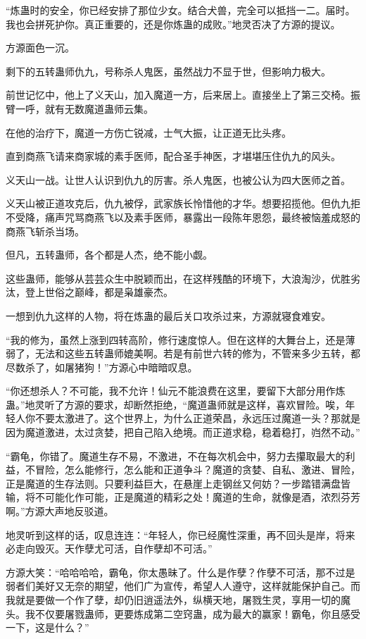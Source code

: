 \begin{this_body}
“炼蛊时的安全，你已经安排了那位少女。结合犬兽，完全可以抵挡一二。届时。我也会拼死护你。真正重要的，还是你炼蛊的成败。”地灵否决了方源的提议。

方源面色一沉。

剩下的五转蛊师仇九，号称杀人鬼医，虽然战力不显于世，但影响力极大。

前世记忆中，他上了义天山，加入魔道一方，后来居上。直接坐上了第三交椅。振臂一呼，就有无数魔道蛊师云集。

在他的治疗下，魔道一方伤亡锐减，士气大振，让正道无比头疼。

直到商燕飞请来商家城的素手医师，配合圣手神医，才堪堪压住仇九的风头。

义天山一战。让世人认识到仇九的厉害。杀人鬼医，也被公认为四大医师之首。

义天山被正道攻克后，仇九被俘，武家族长怜惜他的才华。想要招揽他。但仇九拒不受降，痛声咒骂商燕飞以及素手医师，暴露出一段陈年恩怨，最终被恼羞成怒的商燕飞斩杀当场。

但凡，五转蛊师，各个都是人杰，绝不能小觑。

这些蛊师，能够从芸芸众生中脱颖而出，在这样残酷的环境下，大浪淘沙，优胜劣汰，登上世俗之巅峰，都是枭雄豪杰。

一想到仇九这样的人物，将在炼蛊的最后关口攻杀过来，方源就寝食难安。

“我的修为，虽然上涨到四转高阶，修行速度惊人。但在这样的大舞台上，还是薄弱了，无法和这些五转蛊师媲美啊。若是有前世六转的修为，不管来多少五转，都尽数杀了，如屠猪狗！”方源心中暗暗叹息。

“你还想杀人？不可能，我不允许！仙元不能浪费在这里，要留下大部分用作炼蛊。”地灵听了方源的要求，却断然拒绝，“魔道蛊师就是这样，喜欢冒险。唉，年轻人你不要太激进了。这个世界上，为什么正道荣昌，永远压过魔道一头？那就是因为魔道激进，太过贪婪，把自己陷入绝境。而正道求稳，稳着稳打，岿然不动。”

“霸龟，你错了。魔道生存不易，不激进，不在每次机会中，努力去攥取最大的利益，不冒险，怎么能修行，怎么能和正道争斗？魔道的贪婪、自私、激进、冒险，正是魔道的生存法则。只要利益巨大，在悬崖上走钢丝又何妨？一步踏错满盘皆输，将不可能化作可能，正是魔道的精彩之处！魔道的生命，就像是酒，浓烈芬芳啊。”方源大声地反驳道。

地灵听到这样的话，叹息连连：“年轻人，你已经魔性深重，再不回头是岸，将来必走向毁灭。天作孽尤可活，自作孽却不可活。”

方源大笑：“哈哈哈哈，霸龟，你太愚昧了。什么是作孽？作孽不可活，那不过是弱者们美好又无奈的期望，他们广为宣传，希望人人遵守，这样就能保护自己。而我就是要做一个作了孽，却仍旧逍遥法外，纵横天地，屠戮生灵，享用一切的魔头。我不仅要屠戮蛊师，更要炼成第二空窍蛊，成为最大的赢家！霸龟，你且感受一下，这是什么？”


\end{this_body}

